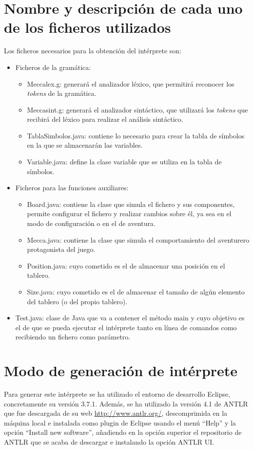\documentclass[a4paper,12pt,twoside,openright]{report}
\begin{document}
  \section{Nombre y descripción de cada uno de los ficheros utilizados}
  Los ficheros necesarios para la obtención del intérprete son:
  \begin{itemize}
  \item Ficheros de la gramática:
  \begin{itemize}
   \item Meccalex.g: generará el analizador léxico, que permitirá reconocer los \emph{tokens} de la gramática.
   \item Meccasint.g: generará el analizador sintáctico, que utilizará los \emph{tokens} que recibirá del 
   léxico para realizar el análisis sintáctico.  
   \item TablaSimbolos.java: contiene lo necesario para crear la tabla de símbolos en la que se almacenarán 
   las variables.
   \item Variable.java: define la clase variable que se utiliza en la tabla de símbolos.
  \end{itemize}
  \item Ficheros para las funciones auxiliares:
  \begin{itemize}
   \item Board.java: contiene la clase que simula el fichero y sus componentes, permite configurar el fichero y realizar 
   cambios sobre él, ya sea en el modo de configuración o en el de aventura.
   \item Mecca.java: contiene la clase que simula el comportamiento del aventurero protagonista del juego.
   \item Position.java: cuyo cometido es el de almacenar una posición en el tablero.
   \item Size.java: cuyo cometido es el de almacenar el tamaño de algún elemento del tablero (o del propio tablero).
  \end{itemize}
  \item Test.java: clase de Java que va a contener el método main y cuyo objetivo es el de que se pueda ejecutar el intérprete 
  tanto en línea de comandos como recibiendo un fichero como parámetro.
  \end{itemize}
  

  
  \section{Modo de generación de intérprete}
  Para generar este intérprete se ha utilizado el entorno de desarrollo Eclipse, concretamente su versión 3.7.1. Además, 
  se ha utilizado la versión 4.1 de ANTLR que fue descargada de su web \url{http://www.antlr.org/}, descomprimida en la 
  máquina local e instalada como plugin de Eclipse usando el menú ``Help'' y la opción ``Install new software'', añadiendo 
  en la opción superior el repositorio de ANTLR que se acaba de descargar e instalando la opción ANTLR UI. 
  
\end{document}
